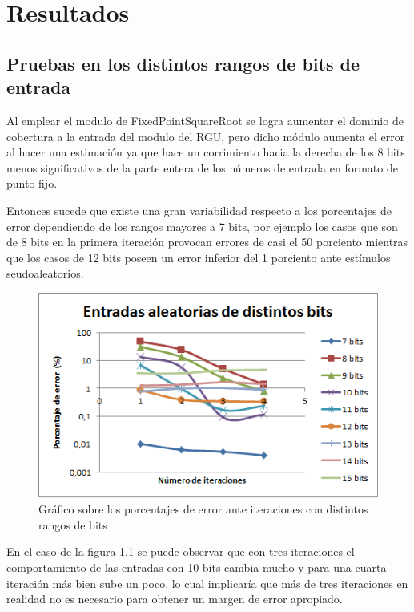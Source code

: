 \chapter{Resultados}

\section{Pruebas en los distintos rangos de bits de entrada}

Al emplear el modulo de FixedPointSquareRoot se logra aumentar el dominio de cobertura a la entrada del modulo del RGU, pero dicho módulo aumenta el error al hacer una estimación ya que hace un corrimiento hacia la derecha de los 8 bits menos significativos de la parte entera de los números de entrada en formato de punto fijo.

Entonces sucede que existe una gran variabilidad respecto a los porcentajes de error dependiendo de los rangos mayores a 7 bits, por ejemplo los casos que son de 8 bits en la primera iteración provocan errores de casi el 50 porciento mientras que los casos de 12 bits poseen un error inferior del 1 porciento ante estímulos seudoaleatorios.

\begin{figure}
	\includegraphics[width=0.7\linewidth]{images/puntos}
	\caption{Gráfico sobre los porcentajes de error ante iteraciones con distintos rangos de bits} \label{fig:puntos}
\end{figure}

En el caso de la figura \ref{fig:puntos} se puede observar que con tres iteraciones el comportamiento de las entradas con 10 bits cambia mucho y para una cuarta iteración más bien sube un poco, lo cual implicaría que más de tres iteraciones en realidad no es necesario para obtener un margen de error apropiado.

